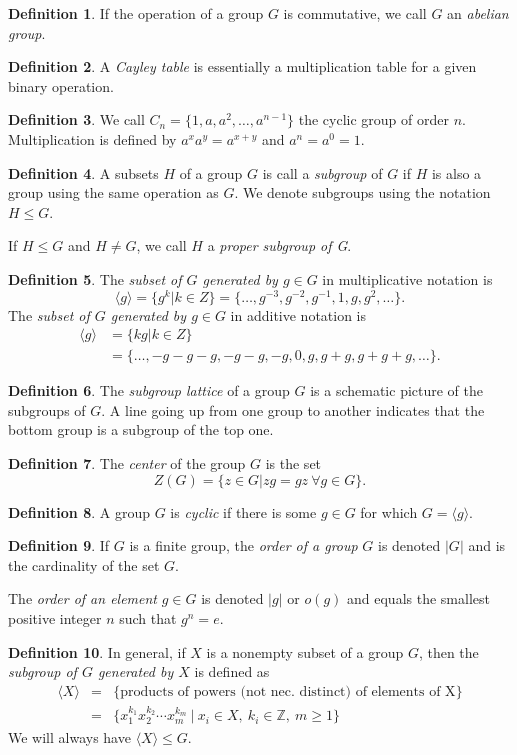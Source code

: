 \documentclass[12pt]{article}
\theoremstyle{definition}
\newtheorem*{defn}{Definition}
\newcommand{\Z}{\mathbb{Z}}
\begin{document}
\begin{defn}
	If the operation of a group $G$ is commutative, we call $G$ an \emph{abelian group}.
\end{defn}
\begin{defn}
A \emph{Cayley table} is essentially a multiplication table for a given binary operation.
\end{defn}
\begin{defn}
We call $C_n=\{1,a,a^2,\dots,a^{n-1}\}$ the cyclic group of order $n$. Multiplication is defined by $a^xa^y=a^{x+y}$ and $a^n=a^0=1$.
\end{defn}
\begin{defn}
A subsets $H$ of a group $G$ is call a \emph{subgroup} of $G$ if $H$ is also a group using the same operation as $G$.
We denote subgroups using the notation $H\leq G$.

If $H\leq G$ and $H\neq G$, we call $H$ a \emph{proper subgroup of G}.
\end{defn}
\begin{defn}
The \emph{subset of $G$ generated by $g\in G$} in multiplicative notation is
\[\langle g\rangle=\{g^k | k\in Z\}=\{\dots,g^{-3},g^{-2},g^{-1},1,g,g^2,\dots\}.\]
The \emph{subset of $G$ generated by $g\in G$} in additive notation is
\begin{align*}
\langle g\rangle&=\{kg | k\in Z\}\\&=\{\dots,-g-g-g,-g-g,-g,0,g,g+g,g+g+g,\dots\}.
\end{align*}
\end{defn}
\begin{defn}
The \emph{subgroup lattice} of a group $G$ is a schematic picture of the subgroups of $G$.  A line going up from one group to another indicates that the bottom group is a subgroup of the top one.
\end{defn}
\begin{defn}
The \emph{center} of the group $G$ is the set
\[Z(G) = \{z\in G|zg=gz\ \forall g\in G\}.\]
\end{defn}
\begin{defn}
A group $G$ is \emph{cyclic} if there is some $g\in G$ for which $G=\langle g\rangle$.
\end{defn}
\begin{defn}
If $G$ is a finite group, the \emph{order of a group} $G$ is denoted $|G|$ and is the cardinality of the set $G$.

The \emph{order of an element} $g\in G$ is denoted $|g|$ or $o(g)$ and equals the smallest positive integer $n$ such that $g^n=e$.
\end{defn}
\begin{defn}
In general, if $X$ is a nonempty subset of a group $G$, then the \emph{subgroup of $G$ generated by $X$} is defined as	
\[\begin{array}{rcl}
\langle X\rangle &=& \{\text{products of powers (not nec. distinct) of elements of X}\}\\
&=&\{x_1^{k_1}x_2^{k_2}\cdots x_m^{k_m}\ |\ x_i\in X,\ k_i\in \Z,\ m\geq 1\}
\end{array}\]
We will always have $\langle X\rangle\leq G$.
\end{defn}
\end{document}
